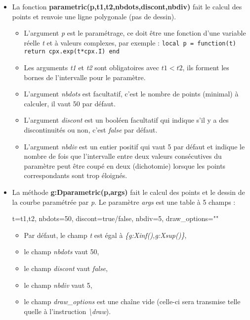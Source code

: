 \documentclass[%
10pt,%
a4paper,%
french,%
]%
{article}%
\begin{document}
\begin{itemize}
\item La fonction \textbf{parametric(p,t1,t2,nbdots,discont,nbdiv)} fait le calcul des points et renvoie une ligne polygonale (pas de dessin).
  \begin{itemize}
    \item L'argument \emph{p} est le paramétrage, ce doit être une fonction d'une variable réelle \emph{t} et à valeurs complexes, par exemple :
    \texttt{local p = function(t) return cpx.exp(t*cpx.I) end}
    \item  Les arguments \emph{t1} et \emph{t2} sont obligatoires avec \(t1 < t2\), ils forment les bornes de l'intervalle pour le paramètre.
    \item L'argument \emph{nbdots} est facultatif, c'est le nombre de points (minimal) à calculer, il vaut 50 par défaut.
    \item L'argument \emph{discont} est un booléen facultatif qui indique s'il y a des discontinuités ou non, c'est \emph{false} par défaut.
    \item L'argument \emph{nbdiv} est un entier positif qui vaut 5 par défaut et indique le nombre de fois que l'intervalle entre deux valeurs consécutives du paramètre peut être coupé en deux (dichotomie) lorsque les points correspondants sont trop éloignés.
  \end{itemize}
  
\item La méthode \textbf{g:Dparametric(p,args)} fait le calcul des points et le dessin de la courbe paramétrée par \emph{p}. Le paramètre \emph{args} est une table à 5 champs :

\begin{TeXcode}
 { t={t1,t2}, nbdots=50, discont=true/false, nbdiv=5, draw_options="" }
\end{TeXcode}

  \begin{itemize}
      \item Par défaut, le champ \emph{t} est égal à \emph{\{g:Xinf(),g:Xsup()\}},
      \item le champ \emph{nbdots} vaut 50, 
      \item le champ \emph{discont} vaut \emph{false},
      \item le champ \emph{nbdiv} vaut 5,
      \item le champ \emph{draw\_options} est une chaîne vide (celle-ci sera transmise telle quelle à l'instruction \emph{\textbackslash draw}).
  \end{itemize}
\end{itemize}  
\end{document}
